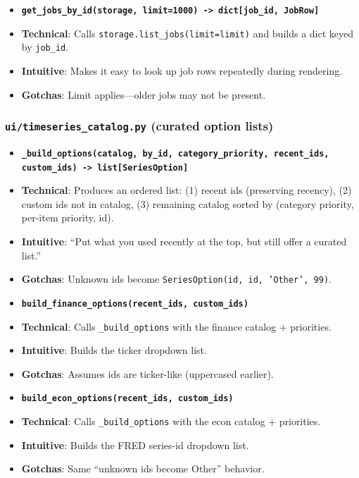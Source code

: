 \documentclass[11pt]{article}
\begin{document}
\begin{itemize}[leftmargin=*,nosep]
\item \textbf{\texttt{get\_jobs\_by\_id(storage, limit=1000) -> dict[job\_id, JobRow]}}
\item \textbf{Technical}: Calls \texttt{storage.list\_jobs(limit=limit)} and builds a dict keyed by \texttt{job\_id}.
\item \textbf{Intuitive}: Makes it easy to look up job rows repeatedly during rendering.
\item \textbf{Gotchas}: Limit applies—older jobs may not be present.
\end{itemize}


\subsubsection{\texttt{ui/timeseries\_catalog.py} (curated option lists)}

\begin{itemize}[leftmargin=*,nosep]
\item \textbf{\texttt{\_build\_options(catalog, by\_id, category\_priority, recent\_ids, custom\_ids) -> list[SeriesOption]}}
\item \textbf{Technical}: Produces an ordered list: (1) recent ids (preserving recency), (2) custom ids not in catalog, (3) remaining catalog sorted by (category priority, per-item priority, id).
\item \textbf{Intuitive}: “Put what you used recently at the top, but still offer a curated list.”
\item \textbf{Gotchas}: Unknown ids become \texttt{SeriesOption(id, id, 'Other', 99)}.
\item \textbf{\texttt{build\_finance\_options(recent\_ids, custom\_ids)}}
\item \textbf{Technical}: Calls \texttt{\_build\_options} with the finance catalog + priorities.
\item \textbf{Intuitive}: Builds the ticker dropdown list.
\item \textbf{Gotchas}: Assumes ids are ticker-like (uppercased earlier).
\item \textbf{\texttt{build\_econ\_options(recent\_ids, custom\_ids)}}
\item \textbf{Technical}: Calls \texttt{\_build\_options} with the econ catalog + priorities.
\item \textbf{Intuitive}: Builds the FRED series-id dropdown list.
\item \textbf{Gotchas}: Same “unknown ids become Other” behavior.
\end{itemize}
\end{document}
